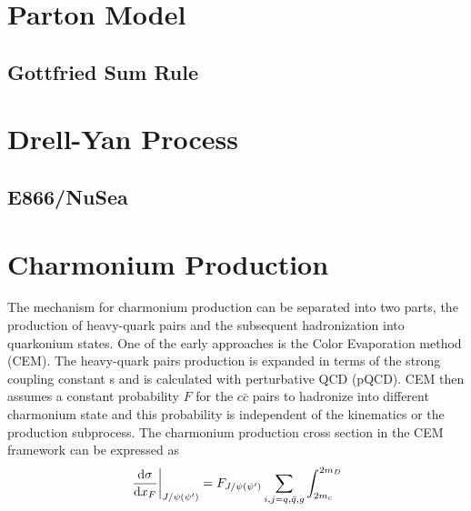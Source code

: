 \section{Parton Model}
\label{sec:parton}

\subsection{Gottfried Sum Rule}
\label{sec:gottfried}

\section{Drell-Yan Process}
\label{sec:DY}


\subsection{E866/NuSea}
\label{sec:E866}

\section{Charmonium Production}
\label{sec:jpsi}
The mechanism for charmonium production can be separated into two parts, the 
production of heavy-quark pairs and the subsequent hadronization into 
quarkonium states. One of the early approaches is the Color Evaporation method 
(CEM)\cite{einhorn1975,bodwin1995,bodwin1997}. The heavy-quark pairs production
is expanded in terms of the strong coupling constant s and is calculated with 
perturbative QCD (pQCD). CEM then assumes a constant probability $F$ for the 
$c\bar{c}$ pairs to hadronize into different charmonium state and this 
probability is independent of the kinematics or the production subprocess. The 
charmonium production cross section in the CEM framework can be expressed as
\begin{equation}
\eval{\dv{\sigma}{x_{F}}}_{J/\psi\left(\psi^\prime\right)} =
	F_{J/\psi\left(\psi^\prime\right)} \sum_{i,j=q,\bar{q},g} \int_{2m_c}^{2m_D}
\end{equation}




